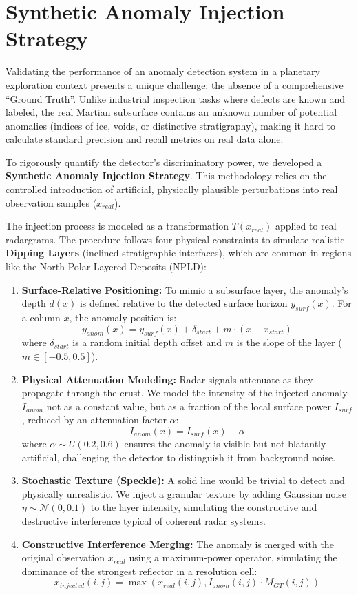 \section{Synthetic Anomaly Injection Strategy}
\label{sec:synthetic_anomaly_injection}
Validating the performance of an anomaly detection system in a planetary exploration context presents a unique challenge: the absence of a comprehensive \enquote{Ground Truth}.
Unlike industrial inspection tasks where defects are known and labeled, the real Martian subsurface contains an unknown number of potential anomalies (indices of ice, voids, or distinctive stratigraphy), making it hard to calculate standard precision and recall metrics on real data alone.

To rigorously quantify the detector's discriminatory power, we developed a \textbf{Synthetic Anomaly Injection Strategy}.
This methodology relies on the controlled introduction of artificial, physically plausible perturbations into real observation samples ($x_{real}$).

The injection process is modeled as a transformation $T(x_{real})$ applied to real radargrams.
The procedure follows four physical constraints to simulate realistic \textbf{Dipping Layers} (inclined stratigraphic interfaces), which are common in regions like the North Polar Layered Deposits (NPLD):

\begin{enumerate}
    \item \textbf{Surface-Relative Positioning:} To mimic a subsurface layer, the anomaly's depth $d(x)$ is defined relative to the detected surface horizon $y_{surf}(x)$. For a column $x$, the anomaly position is:
    $$y_{anom}(x) = y_{surf}(x) + \delta_{start} + m \cdot (x - x_{start})$$
    where $\delta_{start}$ is a random initial depth offset and $m$ is the slope of the layer ($m \in [-0.5, 0.5]$).
    \item \textbf{Physical Attenuation Modeling:} Radar signals attenuate as they propagate through the crust. We model the intensity of the injected anomaly $I_{anom}$ not as a constant value, but as a fraction of the local surface power $I_{surf}$, reduced by an attenuation factor $\alpha$:
    $$I_{anom}(x) = I_{surf}(x) - \alpha$$
    where $\alpha \sim U(0.2, 0.6)$ ensures the anomaly is visible but not blatantly artificial, challenging the detector to distinguish it from background noise.
    \item \textbf{Stochastic Texture (Speckle):} A solid line would be trivial to detect and physically unrealistic. We inject a granular texture by adding Gaussian noise $\eta \sim \mathcal{N}(0, 0.1)$ to the layer intensity, simulating the constructive and destructive interference typical of coherent radar systems.
    \item \textbf{Constructive Interference Merging:} The anomaly is merged with the original observation $x_{real}$ using a maximum-power operator, simulating the dominance of the strongest reflector in a resolution cell:
    $$ x_{injected}(i, j) = \max(x_{real}(i, j), I_{anom}(i, j) \cdot M_{GT}(i, j)) $$
\end{enumerate}

